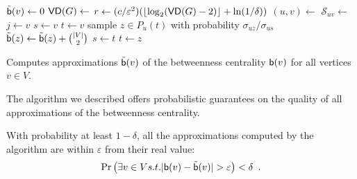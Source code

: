 \begin{algorithm}[h]
   \DontPrintSemicolon
  {
  $\tilde{\mathsf{b}}(v)\leftarrow 0$
  }
  $\mathsf{VD}(G)\leftarrow$\label{alg:diamcomp}\; 
  $r\leftarrow (c/\varepsilon^2)(\lfloor\log_2(\mathsf{VD}(G)-2)\rfloor+\ln(1/\delta))$\;
  {\label{algline:forloop}
  $(u,v)\leftarrow$\;
  $\mathcal{S}_{uv}\leftarrow$\;
  {
  $j\leftarrow v$\;
  $s\leftarrow v$\;
  $t\leftarrow v$\;
   {
  sample $z\in P_u(t)$ with probability $\sigma_{uz}/\sigma_{us}$\;
   {
  $\tilde{\mathsf{b}}(z) \leftarrow \tilde{\mathsf{b}}(z)+\binom{|V|}{2}$\;
  $s\leftarrow t$\;
  $t\leftarrow z$\;
  }
  }
  }
  } %
  \caption{Computes approximations $\tilde{\mathsf{b}}(v)$ of the betweenness
  centrality $\mathsf{b}(v)$ for all vertices $v\in V$.}
  \label{alg:algorithm}
\end{algorithm}

The algorithm we described offers probabilistic guarantees on the quality of all
approximations of the betweenness centrality.
\begin{lemma}\label{lem:correctness}
  With probability at least $1-\delta$, all the approximations computed by the
  algorithm are within $\varepsilon$ from their real value:
  \[
  \Pr\left(\exists v\in V \mbox{ s.t. }
  |\betw(v)-\tilde\betw(v)|>\varepsilon\right)<\delta\enspace .
  \]
\end{lemma}

